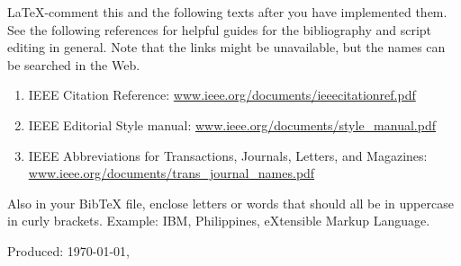 \renewcommand{\UrlFont}{\normalfont}
\begin{SingleSpace}
  {\small }
	\vfill
	\LaTeX-comment this and the following texts after you have implemented them. See the following references for helpful guides for the bibliography and script editing in general.  Note that the links might be unavailable, but the names can be searched in the Web.
		
	\begin{enumerate}
		\item IEEE Citation Reference: \url{www.ieee.org/documents/ieeecitationref.pdf}
		
		\item IEEE Editorial Style manual: \url{www.ieee.org/documents/style_manual.pdf} 
		
		\item IEEE Abbreviations for Transactions, Journals, Letters, and Magazines: \url{www.ieee.org/documents/trans_journal_names.pdf}
	\end{enumerate}
	
\noindent Also in your BibTeX file, enclose letters or words that should all be in uppercase in curly brackets. Example: {IBM}, {P}hilippines, e{X}tensible {M}arkup {L}anguage.

\end{SingleSpace}
\vfill
\begin{flushright}
Produced: \usdate\today, \currenttime \\
\end{flushright}
\cleardoublepage 

%
%
%

\ifPubList
	
\fi
\cleardoublepage

\ifVita
	
\fi
\cleardoublepage

\ifIndex
	\printindex
\fi
\cleardoublepage

